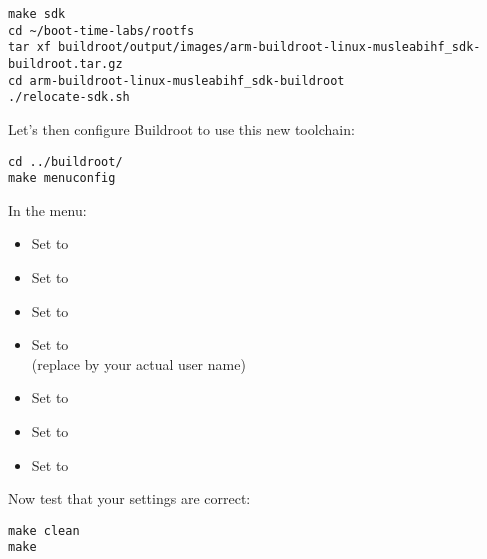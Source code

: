 \begin{verbatim}
make sdk
cd ~/boot-time-labs/rootfs
tar xf buildroot/output/images/arm-buildroot-linux-musleabihf_sdk-buildroot.tar.gz
cd arm-buildroot-linux-musleabihf_sdk-buildroot
./relocate-sdk.sh
\end{verbatim}

Let's then configure Buildroot to use this new toolchain:
\begin{verbatim}
cd ../buildroot/
make menuconfig
\end{verbatim}

In the  menu:
\begin{itemize}
\item Set  to 
\item Set  to 
\item Set  to 
\item Set  to\\
      (replace  by your actual user name)
\item Set  to 
\item Set  to 
\item Set  to 
\end{itemize}

Now test that your settings are correct:

\begin{verbatim}
make clean
make
\end{verbatim}
